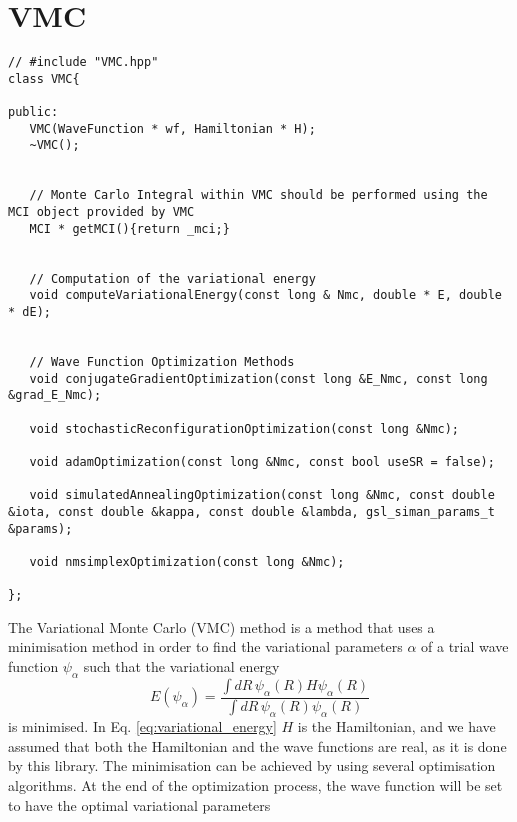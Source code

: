 \documentclass[11pt,a4paper,twoside]{article}
\begin{document}



\section{VMC} %
\label{sec:vmc}

\begin{lstlisting}
// #include "VMC.hpp"
class VMC{

public:
   VMC(WaveFunction * wf, Hamiltonian * H);
   ~VMC();


   // Monte Carlo Integral within VMC should be performed using the MCI object provided by VMC
   MCI * getMCI(){return _mci;}


   // Computation of the variational energy
   void computeVariationalEnergy(const long & Nmc, double * E, double * dE);


   // Wave Function Optimization Methods
   void conjugateGradientOptimization(const long &E_Nmc, const long &grad_E_Nmc);

   void stochasticReconfigurationOptimization(const long &Nmc);

   void adamOptimization(const long &Nmc, const bool useSR = false);

   void simulatedAnnealingOptimization(const long &Nmc, const double &iota, const double &kappa, const double &lambda, gsl_siman_params_t &params);

   void nmsimplexOptimization(const long &Nmc);

};
\end{lstlisting}

The Variational Monte Carlo (VMC) method is a method that uses a minimisation method in order to find the variational parameters $\alpha$ of a trial wave function $\psi_{\alpha}$ such that the variational energy
\begin{equation}
  E(\psi_{\alpha}) = \frac{\int dR \, \psi_{\alpha}(R) H \psi_{\alpha}(R)}{\int dR \, \psi_{\alpha}(R) \psi_{\alpha}(R)}  \label{eq:variational_energy}
\end{equation}
is minimised.
In Eq. \eqref{eq:variational_energy} $H$ is the Hamiltonian, and we have assumed that both the Hamiltonian and the wave functions are real, as it is done by this library.
The minimisation can be achieved by using several optimisation algorithms. At the end of the optimization process, the wave function will be set to have the optimal variational parameters
\end{document}
